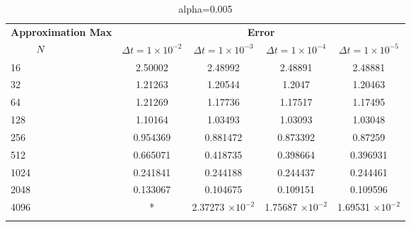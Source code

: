 \begin{table}
	\begin{tabular}{lcccc}
		\toprule
		\multicolumn{1}{c}{\textbf{Approximation Max}} & \multicolumn{4}{c}{\textbf{Error}} \\
		$\hspace{9mm}N$ & $\Delta t=1\times 10^{-2}$ & $\Delta t=1\times 10^{-3}$ & $\Delta t=1\times 10^{-4}$ & $\Delta t=1\times 10^{-5}$ \\
		\midrule
		\hspace{7mm} 16 & 2.50002  & 2.48992   & 2.48891   & 2.48881   \\
		\midrule
		\hspace{7mm} 32 & 1.21263  & 1.20544   & 1.2047    & 1.20463   \\
		\midrule
		\hspace{7mm} 64 & 1.21269  & 1.17736   & 1.17517   & 1.17495   \\
		\midrule
		\hspace{7mm} 128 & 1.10164  & 1.03493   & 1.03093   & 1.03048   \\
		\midrule
		\hspace{7mm} 256 & 0.954369 & 0.881472  & 0.873392  & 0.87259   \\
		\midrule
		\hspace{7mm} 512 & 0.665071 & 0.418735  & 0.398664  & 0.396931  \\
		\midrule
		\hspace{7mm} 1024 & 0.241841 & 0.244188  & 0.244437  & 0.244461  \\
		\midrule
		\hspace{7mm} 2048 & 0.133067 & 0.104675  & 0.109151  & 0.109596  \\
		\midrule
		\hspace{7mm} 4096 & * & 2.37273  $\times 10 ^{-2}$ & 1.75687  $\times 10 ^{-2}$ & 1.69531  $\times 10 ^{-2}$\\
		\\
		\bottomrule
	\end{tabular}
	\caption{alpha=0.005}
\end{table}

